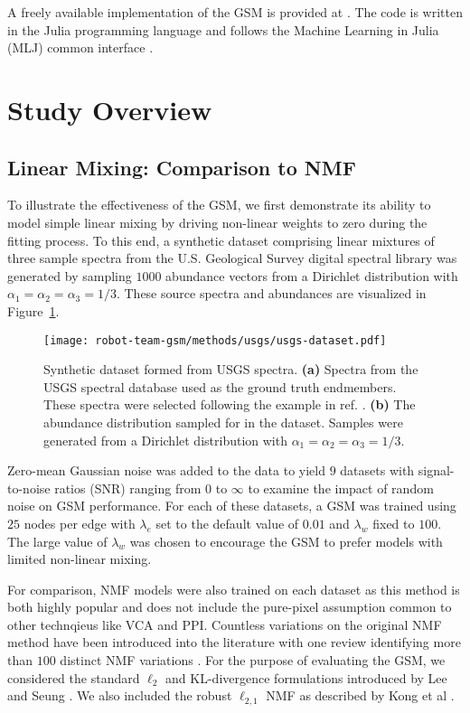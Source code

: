 A freely available implementation of the GSM is provided at \cite{gtm-code}. The
code is written in the Julia programming language and follows the Machine
Learning in Julia (MLJ) common interface \cite{bezanson2012julia, blaom2020mlj}.


\section{Study Overview}

\subsection{Linear Mixing: Comparison to NMF}\label{sec:experiments}

To illustrate the effectiveness of the GSM, we first demonstrate its ability to
model simple linear mixing by driving non-linear weights to zero during the
fitting process. To this end, a synthetic dataset comprising linear mixtures of
three sample spectra from the U.S. Geological Survey digital spectral library
\cite{usgs-spectra} was generated by sampling $1000$ abundance vectors from a
Dirichlet distribution with $\alpha_1=\alpha_2=\alpha_3=1/3$. These source
spectra and abundances are visualized in Figure~\ref{fig:usgs-data}.

\begin{figure}[H]
  \centering
  \texttt{[image: robot-team-gsm/methods/usgs/usgs-dataset.pdf]}
  \caption{Synthetic dataset formed from USGS spectra. \textbf{(a)} Spectra
    from the USGS spectral database used as the ground truth endmembers. These
    spectra were selected following the example in ref. \cite{vca-orig}.
    \textbf{(b)} The abundance distribution sampled for in the dataset. Samples
    were generated from a Dirichlet distribution with
    $\alpha_1=\alpha_2=\alpha_3=1/3$.}
  \label{fig:usgs-data}
\end{figure}

Zero-mean Gaussian noise was added to the data to yield $9$ datasets with
signal-to-noise ratios (SNR) ranging from $0$ to $\infty$ to examine the impact
of random noise on GSM performance. For each of these datasets, a GSM was
trained using $25$ nodes per edge with $\lambda_e$ set to the default value of
$0.01$ and $\lambda_w$ fixed to $100$. The large value of $\lambda_w$ was chosen
to encourage the GSM to prefer models with limited non-linear mixing.


For comparison, NMF models were also trained on each dataset as this method is
both highly popular and does not include the pure-pixel assumption common to
other technqieus like VCA and PPI. Countless variations on the original NMF
method have been introduced into the literature with one review identifying more
than $100$ distinct NMF variations \cite{unmixing-nmf-review}. For the purpose
of evaluating the GSM, we considered the standard $\ell_2$ and KL-divergence
formulations introduced by Lee and Seung \cite{nmf-algorithms}. We also included
the robust $\ell_{2,1}$ NMF as described by Kong et al \cite{nmf-l21}.


